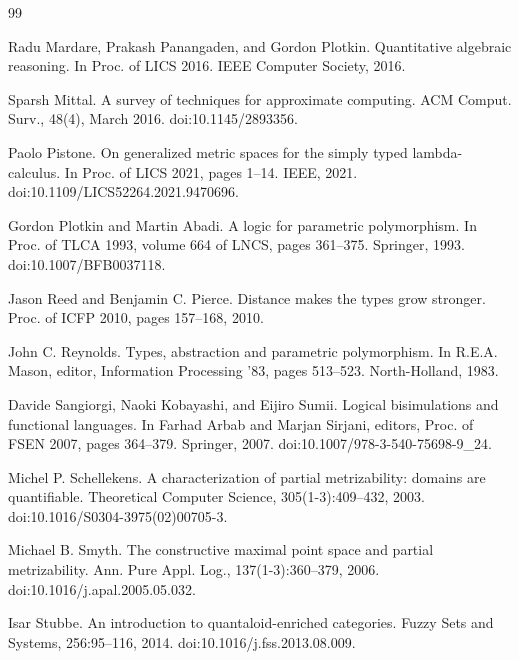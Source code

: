 \documentclass[10pt,a4paper]{amsart}
\begin{document}
\begin{thebibliography}{99}
\par\noindent  [27]  Radu Mardare, Prakash Panangaden, and Gordon Plotkin.  Quantitative algebraic reasoning.  In Proc. of LICS 2016. IEEE Computer Society, 2016.  
 
\par\noindent  [28]  Sparsh Mittal.  A survey of techniques for approximate computing.  ACM Comput. Surv., 48(4), March 2016.  doi:10.1145/2893356.  
 
\par\noindent  [29]  Paolo Pistone.  On generalized metric spaces for the simply typed lambda-calculus.  In Proc. of LICS 2021, pages 1–14. IEEE, 2021.  doi:10.1109/LICS52264.2021.9470696.  
 
\par\noindent  [30]  Gordon Plotkin and Martin Abadi.  A logic for parametric polymorphism.  In Proc. of TLCA 1993, volume 664 of LNCS, pages 361–375. Springer, 1993.  doi:10.1007/BFB0037118.  
 
\par\noindent  [31]  Jason Reed and Benjamin C. Pierce.  Distance makes the types grow stronger.  Proc. of ICFP 2010, pages 157–168, 2010.  
 
\par\noindent  [32]  John C. Reynolds.  Types, abstraction and parametric polymorphism.  In R.E.A. Mason, editor, Information Processing ’83, pages 513–523. North-Holland, 1983.  
 
\par\noindent  [33]  Davide Sangiorgi, Naoki Kobayashi, and Eijiro Sumii.  Logical bisimulations and functional languages.  In Farhad Arbab and Marjan Sirjani, editors, Proc. of FSEN 2007, pages 364–379. Springer, 2007.  doi:10.1007/978-3-540-75698-9\_24.  
 
\par\noindent  [34]  Michel P. Schellekens.  A characterization of partial metrizability: domains are quantifiable.  Theoretical Computer Science, 305(1-3):409–432, 2003.  doi:10.1016/S0304-3975(02)00705-3.  
 
\par\noindent  [35]  Michael B. Smyth.  The constructive maximal point space and partial metrizability.  Ann. Pure Appl. Log., 137(1-3):360–379, 2006.  doi:10.1016/j.apal.2005.05.032.  
 
\par\noindent  [36]  Isar Stubbe.  An introduction to quantaloid-enriched categories.  Fuzzy Sets and Systems, 256:95–116, 2014.  doi:10.1016/j.fss.2013.08.009.  
  
\end{thebibliography}
\end{document}
